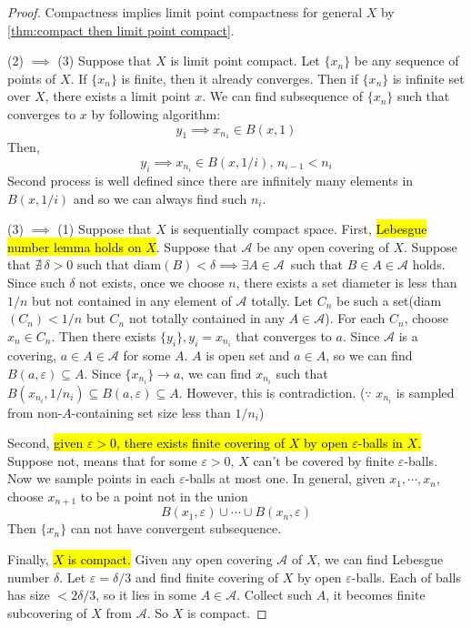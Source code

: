 \documentclass[12pt, a4paper, twoside]{article}
\newcommand{\CA}{{\mathcal {A}}} \newcommand{\CB}{{\mathcal {B}}}
\theoremstyle{plain}
\begin{document}
\begin{proof}
    Compactness implies limit point compactness for general $X$ by \ref{thm:compact then limit point compact}. 

    (2) $\implies$ (3) Suppose that $X$ is limit point compact. 
    Let $\{x_n\}$ be any sequence of points of $X$. If $\{x_n\}$ is finite, then it already converges. 
    Then if $\{x_n\}$ is infinite set over $X$, there exists a limit point $x$. 
    We can find subsequence of $\{x_n\}$ such that converges to $x$ by following algorithm: 
    \[y_1 \implies x_{n_1} \in B(x, 1)\]
    Then, 
    \[y_{i} \implies x_{n_{i}} \in B(x, 1/i), \, n_{i-1} < n_{i}\]
    Second process is well defined since there are infinitely many elements in $B(x, 1/i)$ and 
    so we can always find such $n_i$. 

    (3) $\implies$ (1) Suppose that $X$ is sequentially compact space. 
    First, \hl{Lebesgue number lemma holds on $X$}. Suppose that $\CA$ be any open covering of $X$. 
    Suppose that $\nexists \, \delta > 0$ such that diam$(B) < \delta \implies \exists A \in \CA \,$ such that $B \in A \in \CA$ holds. 
    Since such $\delta$ not exists, once we choose $n$, there exists a set diameter is less than $1/n$ but 
    not contained in any element of $\CA$ totally. 
    Let $C_n$ be such a set(diam$(C_n) < 1/n$ but $C_n$ not totally contained in any $A \in \CA$). 
    For each $C_n$, choose $x_n \in C_n$. Then there exists $\{y_i\}, y_i = x_{n_i}$ that converges to $a$. 
    Since $\CA$ is a covering, $a \in A \in \CA$ for some $A$. 
    $A$ is open set and $a \in A$, so we can find $B(a, \varepsilon) \subseteq A$. 
    Since $\{x_{n_i}\} \rightarrow a$, we can find $x_{n_i}$ such that $B(x_{n_i}, 1/n_i) \subseteq B(a, \varepsilon) \subseteq A$. 
    However, this is contradiction. ($\because$ $x_{n_i}$ is sampled from non-$A$-containing set size less than $1/n_i$)

    Second, \hl{given $\varepsilon > 0$, there exists finite covering of $X$ by open $\varepsilon$-balls in $X$.}
    Suppose not, means that for some $\varepsilon > 0$, $X$ can't be covered by finite $\varepsilon$-balls. 
    Now we sample points in each $\varepsilon$-balls at most one. In general, 
    given $x_1, \cdots, x_n$, choose $x_{n+1}$ to be a point not in the union 
    \[B(x_1, \varepsilon) \cup \cdots \cup B(x_n, \varepsilon)\]
    Then $\{x_n\}$ can not have convergent subsequence. 

    Finally, \hl{$X$ is compact.}
    Given any open covering $\CA$ of $X$, we can find Lebesgue number $\delta$. 
    Let $\varepsilon = \delta/3$ and find finite covering of $X$ by open $\varepsilon$-balls. 
    Each of balls has size $< 2\delta/3$, so it lies in some $A \in \CA$. 
    Collect such $A$, it becomes finite subcovering of $X$ from $\CA$. So $X$ is compact. 
\end{proof}
\end{document}
